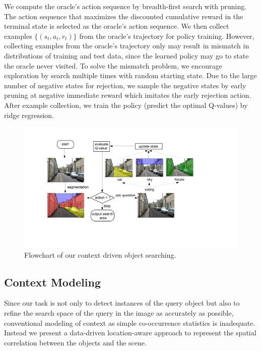 We compute the oracle's action sequence by breadth-first
search with pruning. The action sequence that maximizes the discounted
cumulative reward in the terminal state is selected as the oracle's action
sequence.
We then collect examples $\{(s_t,a_t,r_t)\}$ from the oracle's trajectory for
policy training.
However, collecting examples from the oracle's trajectory
only may result in mismatch in distributions of training and test data, since
the learned policy may go to state the oracle never visited.
To solve the mismatch problem, we encourage exploration by search multiple
times with random starting state.  Due to the large number of negative states for rejection, we sample the negative states by early pruning at negative immediate reward which imitates the early rejection action. After example collection, we train the policy (predict the optimal Q-values) by
ridge regression.

\begin{figure}[htb]
\begin{center}
\includegraphics[width=0.8\linewidth]{figures/flowchart_Q.pdf}
\caption{Flowchart of our context driven object searching. %
}
\label{fig:flowchart}
\end{center}
\end{figure}

\subsection{Context Modeling}
\label{sec:context}
Since our task is not only to detect instances of the query object but also to refine the search space of the query in the image as accurately as possible, conventional modeling of context as simple co-occurrence statistics is inadequate. Instead we present a data-driven location-aware approach to represent the spatial correlation between the objects and the scene. 

